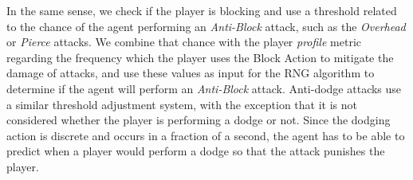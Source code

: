 In the same sense, we check if the player is blocking and use a threshold related to the chance of the agent performing an \emph{Anti-Block} attack, such as the \emph{Overhead} or \emph{Pierce} attacks. We combine that chance with the player \emph{profile} metric regarding the frequency which the player uses the Block Action to mitigate the damage of attacks, and use these values as input for the RNG algorithm to determine if the agent will perform an \emph{Anti-Block} attack. Anti-dodge attacks use a similar threshold adjustment system, with the exception that it is not considered whether the player is performing a dodge or not. Since the dodging action is discrete and occurs in a fraction of a second, the agent has to be able to predict when a player would perform a dodge so that the attack punishes the player.





